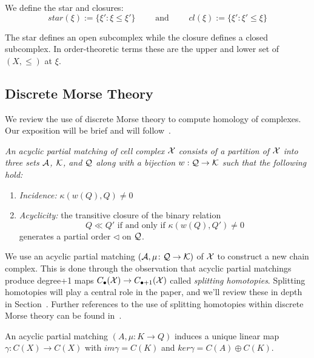 We define the star and closures: 
\[
star(\xi):= \{\xi': \xi \leq \xi'\}\quad\quad \text{ and } \quad\quad cl(\xi) := \{\xi':\xi'\leq \xi\}
\]

The star defines an open subcomplex while the closure defines a closed subcomplex.  In order-theoretic terms these are the upper and lower set of $(X,\leq)$ at $\xi$.





\subsection{Discrete Morse Theory}
We review the use of discrete Morse theory to compute homology of complexes. Our exposition will be brief and will follow~\cite{focm}.

\begin{defn}
{\em
An {\em acyclic partial matching} of cell complex ${\mathcal X}$ consists of a partition of ${\mathcal X}$ into three sets ${\mathcal A}$, ${\mathcal K}$, and ${\mathcal Q}$ along with a bijection $w:{\mathcal Q}\to {\mathcal K}$ such that the following hold:
 \begin{enumerate}
 \item {\em Incidence:} $\kappa(w(Q),Q)\neq 0$
 \item {\em Acyclicity:} the transitive closure of the binary relation $$Q \ll Q' \text{ if and only if } \kappa (w(Q),Q')\neq 0$$
 generates a partial order $\lhd$ on ${\mathcal Q}$.
 \end{enumerate}
 }
 \end{defn} 
 
 We use an acyclic partial matching $({\mathcal A},\mu\colon{\mathcal Q}\to {\mathcal K})$ of ${\mathcal X}$ to construct a new chain complex. This is done through the observation that acyclic partial matchings produce degree+1 maps $C_\bullet({\mathcal X})\to C_{\bullet+1}({\mathcal X})$ called {\em splitting homotopies}.  Splitting homotopies will play a central role in the paper, and we'll review these in depth in Section~\cite{}.  Further references to the use of splitting homotopies within discrete Morse theory can be found in~\cite{sko}.
  
 \begin{prop}\label{prop:matchinghomotopy}
An acyclic partial matching $(A,\mu:K\to Q)$ induces a unique linear map $\gamma:C(X)\to C(X)$ with $im\gamma = C(K)$ and $ker\gamma = C(A)\oplus C(K)$.
\end{prop}
 
